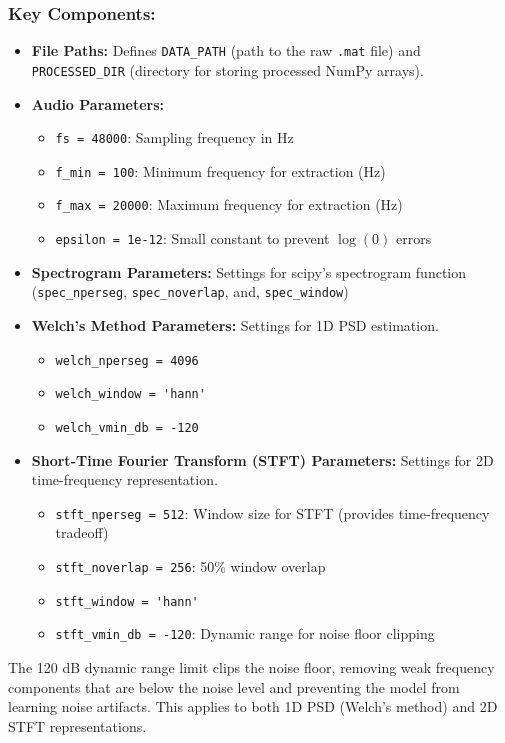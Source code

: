 \subsubsection{Key Components:}
\begin{itemize}
    \item \textbf{File Paths:} Defines \verb|DATA_PATH| (path to the raw \texttt{.mat} file) and \verb|PROCESSED_DIR| 
    (directory for storing processed NumPy arrays).
    \item \textbf{Audio Parameters:} 
    \begin{itemize}
        \item \verb|fs = 48000|: Sampling frequency in Hz
        \item \verb|f_min = 100|: Minimum frequency for extraction (Hz)
        \item \verb|f_max = 20000|: Maximum frequency for extraction (Hz)
        \item \verb|epsilon = 1e-12|: Small constant to prevent $\log(0)$ errors
    \end{itemize}
    \item \textbf{Spectrogram Parameters:} Settings for scipy's spectrogram function (\verb|spec_nperseg|, \verb|spec_noverlap|, 
    and, \verb|spec_window|)
    \item \textbf{Welch's Method Parameters:} Settings for 1D PSD estimation. 
    \begin{itemize}
        \item \verb|welch_nperseg = 4096| 
        \item \verb|welch_window = 'hann'| 
        \item \verb|welch_vmin_db = -120|
    \end{itemize}
    \item \textbf{Short-Time Fourier Transform (STFT) Parameters:} Settings for 2D time-frequency representation.
    \begin{itemize}
        \item \verb|stft_nperseg = 512|: Window size for STFT (provides time-frequency tradeoff)
        \item \verb|stft_noverlap = 256|: 50\% window overlap
        \item \verb|stft_window = 'hann'| 
        \item \verb|stft_vmin_db = -120|: Dynamic range for noise floor clipping
    \end{itemize}
\end{itemize}

The 120 dB dynamic range limit clips the noise floor, removing weak frequency components that are 
below the noise level and preventing the model from learning noise artifacts. This applies to both 
1D PSD (Welch's method) and 2D STFT representations.

